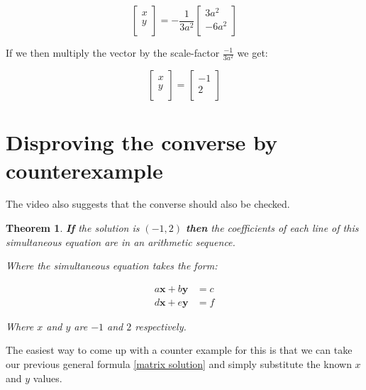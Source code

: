 \documentclass[12pt]{article}
\newtheorem{theorem}{Theorem}
\begin{document}
	\begin{equation*}
		\left [ \begin{array}{c}
			x \\
			y \\
		\end{array}\right ] = 
		-\frac{1}{3a^2}
		\left [ \begin{array}{c} 
			3a^2 \\
			-6a^2 \\
		\end{array} \right ]
	\end{equation*}
	
	If we then multiply the vector by the scale-factor \(\frac{-1}{3a^2}\) we get:
	
	\begin{equation*}
		\left [ \begin{array}{c}
			x \\
			y \\
		\end{array}\right ] = 
		\left [ \begin{array}{c} 
			-1 \\
			2 \\
		\end{array} \right ]
	\end{equation*}
	
	\section{Disproving the converse by counterexample}
	
	The video also suggests that the converse should also be checked.
	
		
	\begin{theorem}\label{converse}
		\textbf{If} the solution is \((-1, 2)\) \textbf{then} the coefficients of each line of this simultaneous equation are in an arithmetic sequence.
		
		Where the simultaneous equation takes the form:
		
		\begin{align}
			a\bm{x} + b\bm{y} &= c \\
			d\bm{x} + e\bm{y} &= f
		\end{align}
		
		Where \(x\) and \(y\) are \(-1\) and \(2\) respectively.
	\end{theorem}

	The easiest way to come up with a counter example for this is that we can take our previous general formula  \eqref{matrix solution} and simply substitute the known \(x\) and \(y\) values.
	
\end{document}
